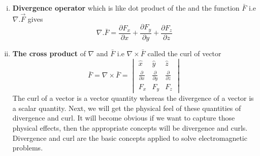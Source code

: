 \begin{enumerate}[(i)]
\item \textbf{Divergence operator} which is like dot product of the  and the function $\bar{F}$ i.e $\nabla.\overrightarrow{F}$ gives
\begin{equation}
\nabla.\bar{F} = \frac{\partial F_{x}}{\partial x} + \frac{\partial F_{y}}{\partial y} + \frac{\partial F_{z}}{\partial z}
\end{equation}
\item \textbf{The cross product} of $\nabla$ and $\bar{F}$ i.e $\nabla \times \bar{F}$ called the curl of vector
\begin{dmath*}
\bar{F} = \nabla \times \bar{F} = 
\begin{vmatrix}
\hat{x} & \hat{y} & \hat{z}\\
\frac{\partial}{\partial x} & \frac{\partial}{\partial y} & \frac{\partial}{\partial z}\\
F_{x} & F_{y} & F_{z}
\end{vmatrix}
\end{dmath*}
The curl of a vector is a vector quantity whereas the divergence of a vector is a scalar quantity. Next, we will get the physical feel of these quantities of divergence and curl. It will become obvious if we want to capture those physical effects, then the appropriate concepts will be divergence and curls. Divergence and curl are the basic concepts applied to solve electromagnetic problems.
\end{enumerate}


